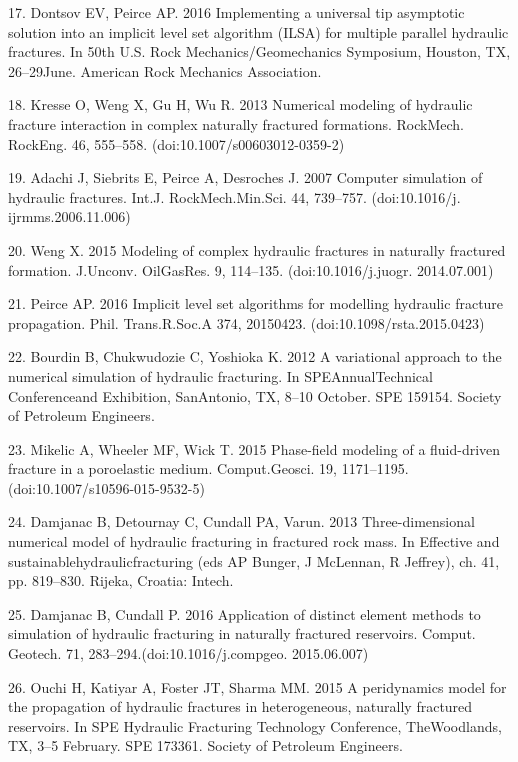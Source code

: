 \documentclass[main.tex]{subfiles}
\begin{document}
17. Dontsov EV, Peirce AP. 2016 Implementing a universal tip asymptotic solution into an implicit level set algorithm (ILSA) for multiple parallel hydraulic fractures. In 50th U.S. Rock Mechanics/Geomechanics Symposium, Houston, TX, 26–29June. American Rock Mechanics Association.

18. Kresse O, Weng X, Gu H, Wu R. 2013 Numerical modeling of hydraulic fracture interaction in complex naturally fractured formations. RockMech. RockEng. 46, 555–558. (doi:10.1007/s00603012-0359-2)

19. Adachi J, Siebrits E, Peirce A, Desroches J. 2007 Computer simulation of hydraulic fractures. Int.J. RockMech.Min.Sci. 44, 739–757. (doi:10.1016/j. ijrmms.2006.11.006)

20. Weng X. 2015 Modeling of complex hydraulic fractures in naturally fractured formation. J.Unconv. OilGasRes. 9, 114–135. (doi:10.1016/j.juogr. 2014.07.001)

21. Peirce AP. 2016 Implicit level set algorithms for modelling hydraulic fracture propagation. Phil. Trans.R.Soc.A 374, 20150423. (doi:10.1098/rsta.2015.0423)

22. Bourdin B, Chukwudozie C, Yoshioka K. 2012 A variational approach to the numerical simulation of hydraulic fracturing. In SPEAnnualTechnical Conferenceand Exhibition, SanAntonio, TX, 8–10 October. SPE 159154. Society of Petroleum Engineers.

23. Mikelic A, Wheeler MF, Wick T. 2015 Phase-field modeling of a fluid-driven fracture in a poroelastic medium. Comput.Geosci. 19, 1171–1195. (doi:10.1007/s10596-015-9532-5)

24. Damjanac B, Detournay C, Cundall PA, Varun. 2013 Three-dimensional numerical model of hydraulic fracturing in fractured rock mass. In Effective and sustainablehydraulicfracturing (eds AP Bunger, J McLennan, R Jeffrey), ch. 41, pp. 819–830. Rijeka, Croatia: Intech.

25. Damjanac B, Cundall P. 2016 Application of distinct element methods to simulation of hydraulic fracturing in naturally fractured reservoirs. Comput. Geotech. 71, 283–294.\newline (doi:10.1016/j.compgeo. 2015.06.007)

26. Ouchi H, Katiyar A, Foster JT, Sharma MM. 2015 A peridynamics model for the propagation of hydraulic fractures in heterogeneous, naturally fractured reservoirs. In SPE Hydraulic Fracturing Technology Conference, TheWoodlands, TX, 3–5 February. SPE 173361. Society of Petroleum Engineers.
\end{document}
